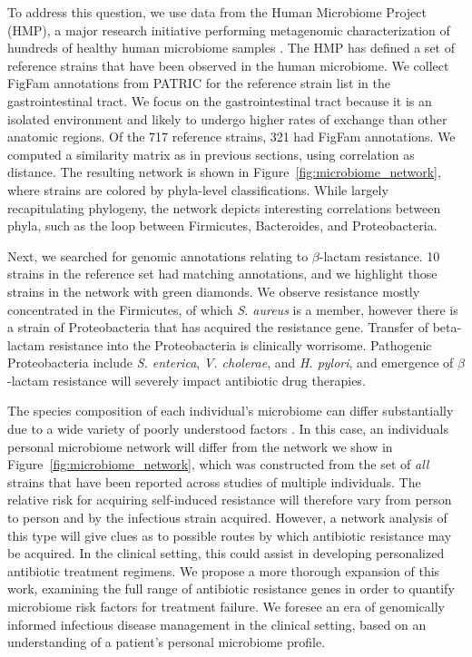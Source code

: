 To address this question, we use data from the Human Microbiome Project (HMP), a major research initiative performing metagenomic characterization of hundreds of healthy human microbiome samples \cite{Consortium:2012bm}.
The HMP has defined a set of reference strains that have been observed in the human microbiome.
We collect FigFam annotations from PATRIC for the reference strain list in the gastrointestinal tract.
We focus on the gastrointestinal tract because it is an isolated environment and likely to undergo higher rates of exchange than other anatomic regions.
Of the 717 reference strains, 321 had FigFam annotations.
We computed a similarity matrix as in previous sections, using correlation as distance.
The resulting network is shown in Figure~\ref{fig:microbiome_network}, where strains are colored by phyla-level classifications.
While largely recapitulating phylogeny, the network depicts interesting correlations between phyla, such as the loop between Firmicutes, Bacteroides, and Proteobacteria.

Next, we searched for genomic annotations relating to $\beta$-lactam resistance.
10 strains in the reference set had matching annotations, and we highlight those strains in the network with green diamonds.
We observe resistance mostly concentrated in the Firmicutes, of which \emph{S. aureus} is a member, however there is a strain of Proteobacteria that has acquired the resistance gene.
Transfer of beta-lactam resistance into the Proteobacteria is clinically worrisome.
Pathogenic Proteobacteria include \emph{S. enterica}, \emph{V. cholerae}, and \emph{H. pylori}, and emergence of $\beta$-lactam resistance will severely impact antibiotic drug therapies.

The species composition of each individual's microbiome can differ substantially due to a wide variety of poorly understood factors \cite{Consortium:2012bm}.
In this case, an individuals personal microbiome network will differ from the network we show in Figure~\ref{fig:microbiome_network}, which was constructed from the set of \emph{all} strains that have been reported across studies of multiple individuals.
The relative risk for acquiring self-induced resistance will therefore vary from person to person and by the infectious strain acquired.
However, a network analysis of this type will give clues as to possible routes by which antibiotic resistance may be acquired.
In the clinical setting, this could assist in developing personalized antibiotic treatment regimens.
We propose a more thorough expansion of this work, examining the full range of antibiotic resistance genes in order to quantify microbiome risk factors for treatment failure.
We foresee an era of genomically informed infectious disease management in the clinical setting, based on an understanding of a patient's personal microbiome profile.

